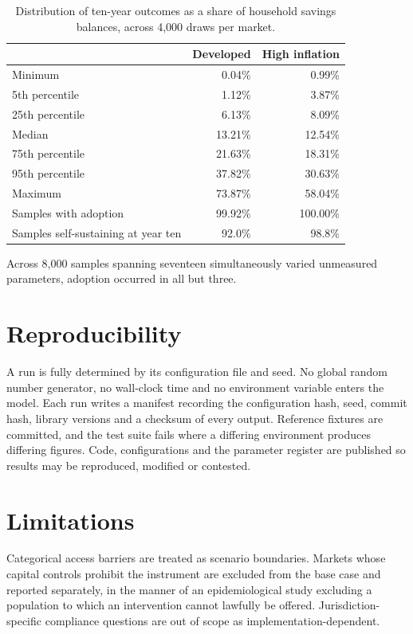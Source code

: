 \documentclass[11pt,a4paper]{article}
\begin{document}
\begin{table}[h]
\small
\begin{tabular}{@{}lrr@{}}
\toprule
& Developed & High inflation \\
\midrule
Minimum & 0.04\% & 0.99\% \\
5th percentile & 1.12\% & 3.87\% \\
25th percentile & 6.13\% & 8.09\% \\
Median & 13.21\% & 12.54\% \\
75th percentile & 21.63\% & 18.31\% \\
95th percentile & 37.82\% & 30.63\% \\
Maximum & 73.87\% & 58.04\% \\
\midrule
Samples with adoption & 99.92\% & 100.00\% \\
Samples self-sustaining at year ten & 92.0\% & 98.8\% \\
\bottomrule
\end{tabular}
\caption{Distribution of ten-year outcomes as a share of household savings
balances, across 4{,}000 draws per market.}
\end{table}

Across 8{,}000 samples spanning seventeen simultaneously varied unmeasured
parameters, adoption occurred in all but three.

\section{Reproducibility}

A run is fully determined by its configuration file and seed. No global
random number generator, no wall-clock time and no environment variable
enters the model. Each run writes a manifest recording the configuration
hash, seed, commit hash, library versions and a checksum of every output.
Reference fixtures are committed, and the test suite fails where a differing
environment produces differing figures. Code, configurations and the
parameter register are published so results may be reproduced, modified or
contested.

\section{Limitations}

Categorical access barriers are treated as scenario boundaries. Markets
whose capital controls prohibit the instrument are excluded from the base
case and reported separately, in the manner of an epidemiological study
excluding a population to which an intervention cannot lawfully be offered.
Jurisdiction-specific compliance questions are out of scope as
implementation-dependent.
\end{document}
